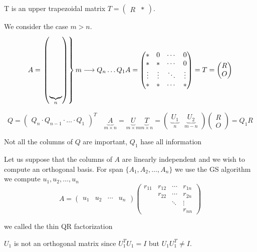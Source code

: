 T is an upper trapezoidal matrix $ T = \begin{pmatrix} R & * \end{pmatrix}$.

We consider the case $m > n$.
\[
A = \left.
\begin{pmatrix}
    \underbrace{\rule{0pt}{3cm}}_{n} \\
\end{pmatrix}
\right\}m
\longrightarrow Q_{n}\ldots Q_1A = \begin{pmatrix}
    * & 0 & \cdots & 0 \\
    * & * & \cdots & 0 \\
    \vdots & \vdots & \ddots & \vdots \\
    * & * & \cdots & *
\end{pmatrix} = T = \begin{pmatrix}
    R \\ O
\end{pmatrix}
\]

$$
Q = \begin{pmatrix} Q_n \cdot Q_{n-1} \cdot \ldots \cdot Q_1 \end{pmatrix}^T \quad
\underbrace{A}_{m \times n} = \underbrace{U}_{m \times m} \underbrace{T}_{m \times n}
= \begin{pmatrix}
    \underbrace{U_1}_{n} & \underbrace{U_2}_{m-n}
\end{pmatrix}
\begin{pmatrix}
    R \\ O
\end{pmatrix}
= Q_1R
$$

Not all the columns of $Q$ are important, $Q_1$ hase all information

Let us suppose that the columns of $A$ are linearly independent and we wish to compute an orthogonal basis.
For span $\{A_1, A_2, \ldots, A_n\}$ we use the GS algorithm we compute $u_1, u_2, \ldots, u_n$
\[
A = \begin{pmatrix}
    u_1 & u_2 & \cdots & u_n
\end{pmatrix}
\begin{pmatrix}
    r_{11} & r_{12} & \cdots & r_{1n} \\
    & r_{22} & \cdots & r_{2n} \\
    & & \ddots & \vdots \\
    & & & r_{nn}
\end{pmatrix}
\]

we called the thin QR factorization

$U_1$ is not an orthogonal matrix since $U_1^T U_1 = I$ but $U_1 U_1^T \neq I$.


